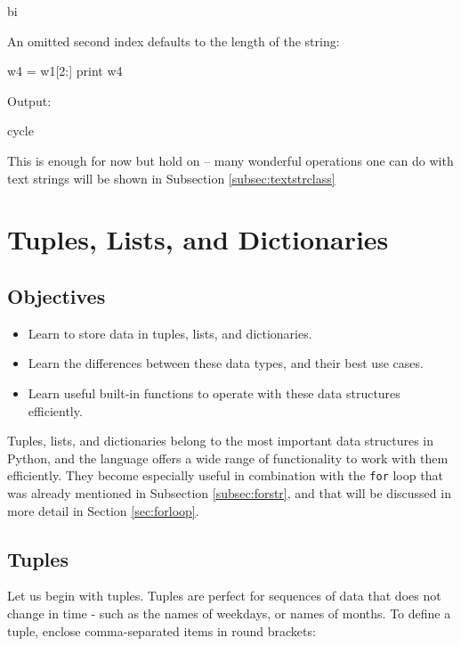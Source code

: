 \begin{greencode}
bi
\end{greencode}
An omitted second index defaults to the length of the string:

\begin{bluecode}
w4 = w1[2:]
print w4
\end{bluecode}
Output:

\begin{greencode}
cycle
\end{greencode}
This is enough for now but hold on -- many wonderful operations one 
can do with text strings will be shown in Subsection \ref{subsec:textstrclass}



\section{Tuples, Lists, and Dictionaries}\label{sec:lists}

\subsection{Objectives}

\begin{itemize}
\item Learn to store data in tuples, lists, and dictionaries.
\item Learn the differences between these data types, and their best use cases.
\item Learn useful built-in functions to operate with these data structures efficiently. 
\end{itemize}
Tuples, lists, and dictionaries belong to the most important data structures in Python, and the 
language offers a wide range of functionality to work with them efficiently. They become 
especially useful in combination with the {\tt for}
loop that was already mentioned in Subsection \ref{subsec:forstr}, and that will be 
discussed in more detail in Section \ref{sec:forloop}. 

\subsection{Tuples}

Let us begin with tuples. Tuples are perfect for sequences 
of data that does not change in time - such as 
the names of weekdays, or names of months. To define a tuple, 
enclose comma-separated items in round brackets:

